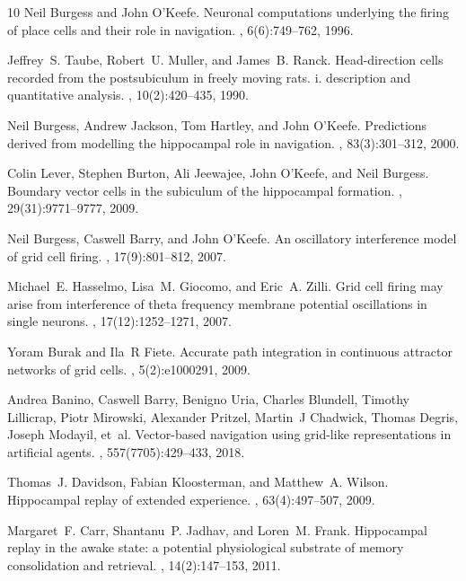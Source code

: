 \documentclass[conference]{IEEEtran}
\begin{document}
\begin{thebibliography}{10}
Neil Burgess and John O'Keefe.
\newblock Neuronal computations underlying the firing of place cells and their
  role in navigation.
, 6(6):749--762, 1996.

Jeffrey~S. Taube, Robert~U. Muller, and James~B. Ranck.
\newblock Head-direction cells recorded from the postsubiculum in freely moving
  rats. i. description and quantitative analysis.
, 10(2):420--435, 1990.

Neil Burgess, Andrew Jackson, Tom Hartley, and John O'Keefe.
\newblock Predictions derived from modelling the hippocampal role in
  navigation.
, 83(3):301--312, 2000.

Colin Lever, Stephen Burton, Ali Jeewajee, John O'Keefe, and Neil Burgess.
\newblock Boundary vector cells in the subiculum of the hippocampal formation.
, 29(31):9771--9777, 2009.

Neil Burgess, Caswell Barry, and John O'Keefe.
\newblock An oscillatory interference model of grid cell firing.
, 17(9):801--812, 2007.

Michael~E. Hasselmo, Lisa~M. Giocomo, and Eric~A. Zilli.
\newblock Grid cell firing may arise from interference of theta frequency
  membrane potential oscillations in single neurons.
, 17(12):1252--1271, 2007.

Yoram Burak and Ila~R Fiete.
\newblock Accurate path integration in continuous attractor networks of grid
  cells.
, 5(2):e1000291, 2009.

Andrea Banino, Caswell Barry, Benigno Uria, Charles Blundell, Timothy
  Lillicrap, Piotr Mirowski, Alexander Pritzel, Martin~J Chadwick, Thomas
  Degris, Joseph Modayil, et~al.
\newblock Vector-based navigation using grid-like representations in artificial
  agents.
, 557(7705):429--433, 2018.

Thomas~J. Davidson, Fabian Kloosterman, and Matthew~A. Wilson.
\newblock Hippocampal replay of extended experience.
, 63(4):497--507, 2009.

Margaret~F. Carr, Shantanu~P. Jadhav, and Loren~M. Frank.
\newblock Hippocampal replay in the awake state: a potential physiological
  substrate of memory consolidation and retrieval.
, 14(2):147--153, 2011.


\end{thebibliography}
\end{document}
